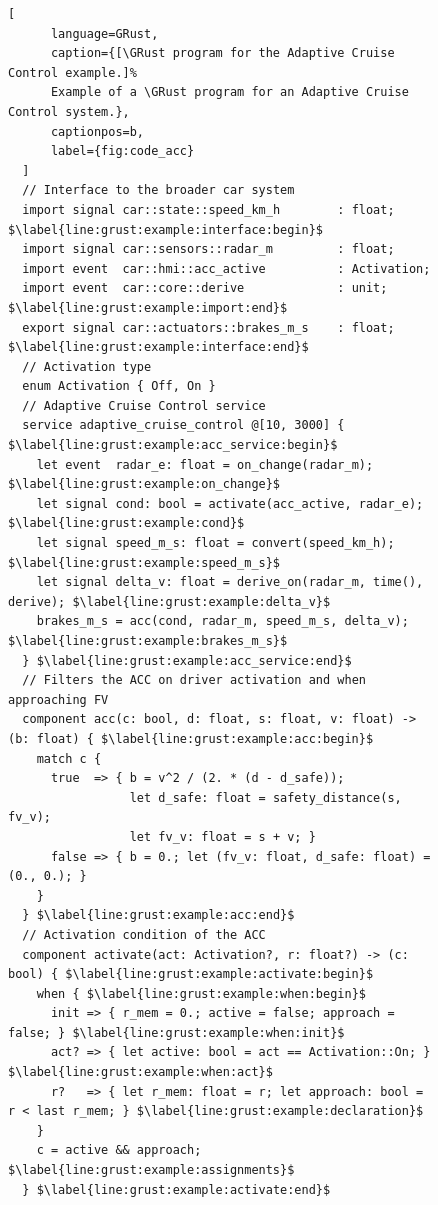\begin{figure}[ht!]
  \begin{lstlisting}[
      language=GRust,
      caption={[\GRust program for the Adaptive Cruise Control example.]%
      Example of a \GRust program for an Adaptive Cruise Control system.},
      captionpos=b,
      label={fig:code_acc}
  ]
  // Interface to the broader car system
  import signal car::state::speed_km_h        : float; $\label{line:grust:example:interface:begin}$
  import signal car::sensors::radar_m         : float;
  import event  car::hmi::acc_active          : Activation;
  import event  car::core::derive             : unit; $\label{line:grust:example:import:end}$
  export signal car::actuators::brakes_m_s    : float; $\label{line:grust:example:interface:end}$
  // Activation type
  enum Activation { Off, On }
  // Adaptive Cruise Control service
  service adaptive_cruise_control @[10, 3000] { $\label{line:grust:example:acc_service:begin}$
    let event  radar_e: float = on_change(radar_m); $\label{line:grust:example:on_change}$
    let signal cond: bool = activate(acc_active, radar_e); $\label{line:grust:example:cond}$
    let signal speed_m_s: float = convert(speed_km_h); $\label{line:grust:example:speed_m_s}$
    let signal delta_v: float = derive_on(radar_m, time(), derive); $\label{line:grust:example:delta_v}$
    brakes_m_s = acc(cond, radar_m, speed_m_s, delta_v); $\label{line:grust:example:brakes_m_s}$
  } $\label{line:grust:example:acc_service:end}$
  // Filters the ACC on driver activation and when approaching FV
  component acc(c: bool, d: float, s: float, v: float) -> (b: float) { $\label{line:grust:example:acc:begin}$
    match c {
      true  => { b = v^2 / (2. * (d - d_safe));
                 let d_safe: float = safety_distance(s, fv_v);
                 let fv_v: float = s + v; }
      false => { b = 0.; let (fv_v: float, d_safe: float) = (0., 0.); }
    }
  } $\label{line:grust:example:acc:end}$
  // Activation condition of the ACC
  component activate(act: Activation?, r: float?) -> (c: bool) { $\label{line:grust:example:activate:begin}$
    when { $\label{line:grust:example:when:begin}$
      init => { r_mem = 0.; active = false; approach = false; } $\label{line:grust:example:when:init}$
      act? => { let active: bool = act == Activation::On; } $\label{line:grust:example:when:act}$
      r?   => { let r_mem: float = r; let approach: bool = r < last r_mem; } $\label{line:grust:example:declaration}$
    }
    c = active && approach; $\label{line:grust:example:assignments}$
  } $\label{line:grust:example:activate:end}$

\end{lstlisting}
\end{figure}
